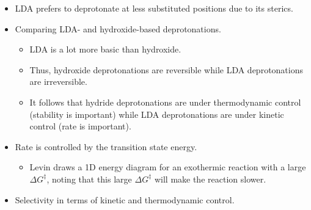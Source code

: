 \documentclass[../notes.tex]{subfiles}
\begin{document}
\begin{itemize}
\begin{itemize}
    \end{itemize}
    \item LDA prefers to deprotonate at less substituted positions due to its sterics.
    \item Comparing LDA- and hydroxide-based deprotonations.
    \begin{itemize}
        \item LDA is a lot more basic than hydroxide.
        \item Thus, hydroxide deprotonations are reversible while LDA deprotonations are irreversible.
        \item It follows that hydride deprotonations are under thermodynamic control (stability is important) while LDA deprotonations are under kinetic control (rate is important).
    \end{itemize}
    \item Rate is controlled by the transition state energy.
    \begin{itemize}
        \item Levin draws a 1D energy diagram for an exothermic reaction with a large $\Delta G^\ddagger$, noting that this large $\Delta G^\ddagger$ will make the reaction slower.
    \end{itemize}
    \item Selectivity in terms of kinetic and thermodynamic control.
    \begin{figure}[h!]
        \centering
\end{figure}
\end{itemize}
\end{document}
